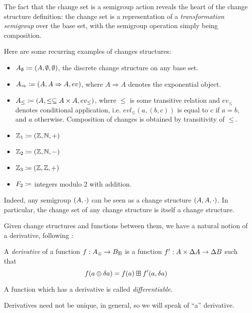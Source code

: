 The fact that the change set is a semigroup action reveals the heart of the
change structure definition: the change set is a representation of a
\textit{transformation semigroup} over the base set, with the semigroup
operation simply being composition.

Here are some recurring examples of changes structures:
\begin{itemize}
  \item $A_\emptyset \coloneqq (A,\emptyset,\emptyset)$, the discrete change structure on any base set.
  \item $A_\Rightarrow \coloneqq (A,A\Rightarrow A,ev)$, where $A \Rightarrow A$ denotes the exponential object.
  \item $A_\leq \coloneqq (A,\leq \subseteq A \times A,ev_\leq)$, where $\leq$ is some transitive relation and $ev_\leq$ denotes
    conditional application, i.e. $evl_\leq(a, (b, c))$ is equal to $c$ if $a = b$, and $a$ otherwise. Composition of changes is obtained
    by transitivity of $\leq$.
  \item $\mathbb{Z}_1 \coloneqq (\mathbb{Z},\mathbb{N},+)$
  \item $\mathbb{Z}_2 \coloneqq (\mathbb{Z},\mathbb{N},-)$
  \item $\mathbb{Z}_3 \coloneqq (\mathbb{Z},\mathbb{Z},+)$
  \item $F_2 \coloneqq$ integers modulo 2 with addition.
\end{itemize}
Indeed, any semigroup $(A, \cdot)$ can be seen as a change structure $(A,A,\cdot)$. In particular,
the change set of any change structure is itself a change structure.

Given change structures and functions between them, we have a natural notion of a derivative, following \cite{cai2014changes}:

\begin{defn}[Derivatives]
  A \textit{derivative} of a function $f: A_\oplus \rightarrow B_\boxplus$ is a function $f': A \times \Delta A \rightarrow
  \Delta B$ such that
  $$f(a \oplus \delta a) = f(a) \boxplus f'(a, \delta a)$$

  A function which has a derivative is called \textit{differentiable}.
\end{defn}

Derivatives need not be unique, in general, so we will speak of ``a''
derivative. 

